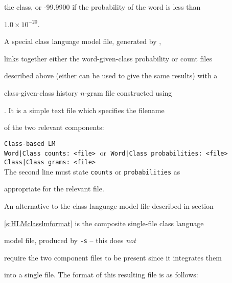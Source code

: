 the class, or -99.9900 if the probability of the word is less than


$1.0\times10^{-20}$.












A special class language model file, generated by ,


links together either the word-given-class probability or count files


described above (either can be used to give the same results) with a


class-given-class history $n$-gram file constructed using


.  It is a simple text file which specifies the filename


of the two relevant components:





\noindent\texttt{Class-based LM}\\


\texttt{Word|Class counts: <file>} $\;$or$\;$ \texttt{Word|Class probabilities: <file>}\\


\texttt{Class|Class grams: <file>}\\


The second line must state {\tt counts} or {\tt probabilities} as


appropriate for the relevant file.












An alternative to the class language model file described in section


\ref{s:HLMclasslmformat} is the composite single-file class language


model file, produced by { \tt -s} -- this does {\it not}


require the two component files to be present since it integrates them


into a single file.  The format of this resulting file is as follows:





